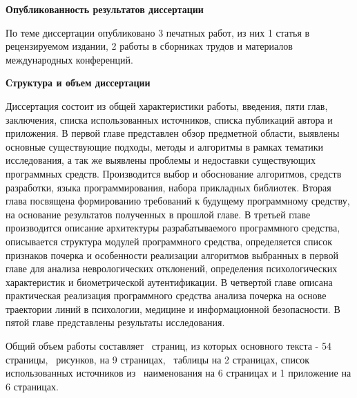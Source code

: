 \bigskip
\textbf{Опубликованность результатов диссертации}
\bigskip

По теме диссертации опубликовано 3 печатных работ, из них 1 статья в рецензируемом издании, 2 работы в сборниках трудов и материалов международных конференций.

\bigskip
\textbf{Структура и объем диссертации}
\bigskip

Диссертация состоит из общей характеристики работы, введения, пяти глав, заключения, списка использованных источников, списка публикаций автора и приложения. В первой главе представлен обзор предметной области, выявлены основные существующие подходы, методы и алгоритмы в рамках тематики исследования, а так же выявлены проблемы и недоставки существующих программных средств. Производится выбор и обоснование алгоритмов, средств разработки, языка программирования, набора прикладных библиотек. Вторая глава посвящена формированию требований к будущему программному средству, на основание результатов полученных в прошлой главе. В третьей главе производится описание архитектуры разрабатываемого программного средства, описывается структура модулей программного средства, определяется список признаков почерка и особенности реализации алгоритмов выбранных в первой главе для анализа неврологических отклонений, определения психологических характеристик и биометрической аутентификации. В четвертой главе описана практическая реализация программного средства анализа почерка на основе траектории линий в психологии, медицине и информационной безопасности. В пятой главе представлены результаты исследования.

Общий объем работы составляет \totpages~страниц, из которых основного текста - 54 страницы, \totfig{}~рисунков, на 9 страницах, \tottab{}~таблицы на 2 страницах, список использованных источников из \totref{}~наименования на 6 страницах и 1 приложение на 6 страницах.